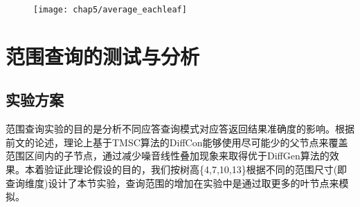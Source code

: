 \begin{figure}[!htp]
	\centering
	\texttt{[image: chap5/average\_eachleaf]}
\end{figure}


\section{范围查询的测试与分析}
\subsection{实验方案}

范围查询实验的目的是分析不同应答查询模式对应答返回结果准确度的影响。根据前文的论述，理论上基于TMSC算法的DiffCon能够使用尽可能少的父节点来覆盖范围区间内的子节点，通过减少噪音线性叠加现象来取得优于DiffGen算法的效果。本着验证此理论假设的目的，我们按树高\{4,7,10,13\}根据不同的范围尺寸(即查询维度)设计了本节实验，查询范围的增加在实验中是通过取更多的叶节点来模拟。

